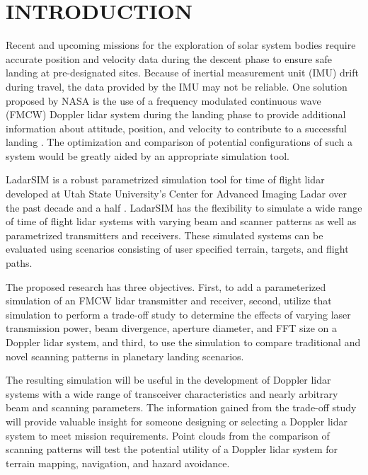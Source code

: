 %
%
%
%

\chapter{INTRODUCTION}
\thispagestyle{empty}
Recent and upcoming missions for the exploration of solar system bodies require accurate
position and velocity data during the descent phase to ensure safe landing at pre-designated
sites. Because of inertial measurement unit (IMU) drift during travel, the data provided 
by the IMU may not be reliable. One solution proposed by NASA is the use of a frequency
modulated continuous wave (FMCW) Doppler lidar system during the landing phase to provide
additional information about attitude, position, and velocity to contribute to a successful
landing \cite{amz12,amz12fiber,amz12p2}. The optimization and comparison of potential configurations
of such a system would be greatly aided by an appropriate simulation tool.

LadarSIM is a robust parametrized simulation tool for time of flight lidar
developed at Utah State University's Center
for Advanced Imaging Ladar over the past decade and a half \cite{budgeLeishman,neilsenBudge}.
LadarSIM has the flexibility to simulate a wide range of time of flight
lidar systems with varying beam and scanner patterns as well as parametrized transmitters
and receivers.
These simulated systems can be evaluated using scenarios consisting of
user specified terrain, targets, and flight paths.

The proposed research has three objectives. First, to add a parameterized simulation
of an FMCW lidar transmitter and receiver, second, utilize that simulation to perform
a trade-off study to determine the effects of varying laser transmission power, beam
divergence, aperture diameter, and FFT size on a Doppler lidar system, and third, to use the
simulation to compare traditional and novel scanning patterns in planetary landing 
scenarios. 

The resulting simulation will be useful in the development of Doppler lidar systems
with a wide range of transceiver characteristics and nearly arbitrary beam and 
scanning parameters. The information gained from the trade-off study will provide
valuable insight for someone designing or selecting a Doppler lidar system to meet
mission requirements. Point clouds from the comparison of scanning patterns will 
test the potential utility of a Doppler lidar system for terrain mapping, navigation,
and hazard avoidance. 

